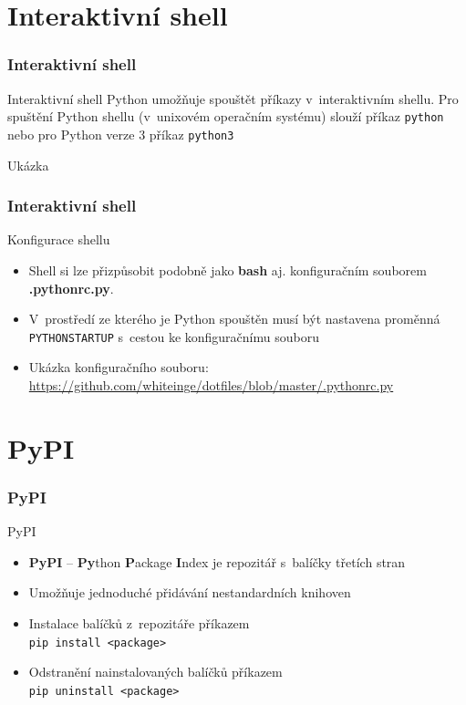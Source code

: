\documentclass[color=rose,utf8]{beamer}
\newcommand{\myurl}[1]{{\scriptsize\color{blue}\url{#1}}}
\begin{document}
  \section{Interaktivní shell}
  \begin{frame}[t]
    \frametitle{Interaktivní shell}
    \begin{block}{Interaktivní shell}
      Python umožňuje spouštět příkazy v~interaktivním shellu. Pro spuštění
      Python shellu (v~unixovém operačním systému) slouží příkaz 
      \texttt{python} nebo pro Python verze 3 příkaz \texttt{python3}
    \end{block}
    \begin{exampleblock}{Ukázka}
      \pythonhello
    \end{exampleblock}
  \end{frame}
  \begin{frame}[t]
    \frametitle{Interaktivní shell}
    \begin{block}{Konfigurace shellu}
      \begin{itemize}
        \item Shell si lze přizpůsobit podobně jako \textbf{bash} aj. 
          konfiguračním souborem \textbf{.pythonrc.py}.
        \item V~prostředí ze kterého je Python spouštěn musí být nastavena
          proměnná \texttt{PYTHONSTARTUP} s~cestou ke konfiguračnímu souboru
        \item Ukázka konfiguračního souboru: 
          \myurl{
            https://github.com/whiteinge/dotfiles/blob/master/.pythonrc.py
          }
      \end{itemize}
    \end{block}
  \end{frame}


  \section{PyPI}
  \begin{frame}[t]
    \frametitle{PyPI}
    \begin{block}{PyPI}
       \begin{itemize}
          \item \textbf{PyPI} -- \textbf{Py}thon \textbf{P}ackage 
            \textbf{I}ndex je repozitář s~balíčky třetích stran
          \item Umožňuje jednoduché přidávání nestandardních knihoven
          \item Instalace balíčků z~repozitáře příkazem \\
            \texttt{pip install <package>}
          \item Odstranění nainstalovaných balíčků příkazem \\
            \texttt{pip uninstall <package>}
        \end{itemize}
    \end{block}
  \end{frame}
\end{document}
